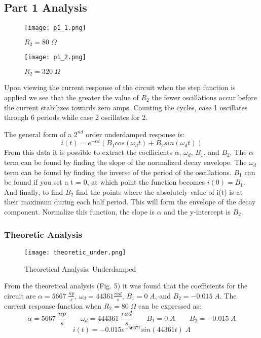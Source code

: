 \documentclass[11pt]{article}
\begin{document}
\subsection*{\textcolor{mycolor}{Part 1 Analysis}}
\begin{figure}[H]
    \centering
    \texttt{[image: p1\_1.png]}
    \caption{$R_2 = 80 \;\Omega$}
    \label{fig:chart1}
\end{figure}
\begin{figure}[H]
    \centering
    \texttt{[image: p1\_2.png]}
    \caption{$R_2 = 320 \;\Omega$}
    \label{fig:chart2}
\end{figure}

Upon viewing the current response of the circuit when the step function is applied we see that the greater the value of $R_2$ the fewer oscillations occur before the current stabilizes towards zero amps. Counting the cycles, case 1 oscillates through 6 periods while case 2 oscillates for 2.

\noindent The general form of a $2^{nd}$ order underdamped response is:
$$i(t) = e^{-\alpha t}(B_1 cos(\omega_d t)+ B_2 sin (\omega_d t))$$
From this data it is possible to extract the coefficients $\alpha$, $\omega_d$, $B_1$, and $B_2$. The $\alpha$ term can be found by finding the slope of the normalized decay envelope. The $\omega_d$ term can be found by finding the inverse of the period of the oscillations. $B_1$ can be found if you set a t = 0, at which point the function becomes $i(0) = B_1$. And finally, to find $B_2$ find the points where the absolutely value of i(t) is at their maximum during each half period. This will form the envelope of the decay component. Normalize this function, the slope is $\alpha$ and the y-intercept is $B_2$. 

\subsubsection*{\textcolor{mycolor}{Theoretic Analysis}}
\begin{figure}[H]
  \centering
  \texttt{[image: theoretic\_under.png]}
  \caption{Theoretical Analysis: Underdamped}
  \label{fig:4}
\end{figure}
From the theoretical analysis (Fig. 5) it was found that the coefficients for the circuit are $\alpha=5667\;\frac{np}{s}$, $\omega_d=44361\frac{rad}{s}$, $B_1 = 0\;A$, and $B_2 = -0.015\;A$. The current response function when $R_2=80\;\Omega$ can be expressed as:
$$\alpha = 5667 \;\frac{np}{s} \qquad \omega_d = 444361\; \frac{rad}{s} \qquad B_1 = 0 \;A \qquad B_2 = -0.015 \;A$$
$$i(t) = -0.015e^{-5667t}sin(44361t) \;A$$
\end{document}
